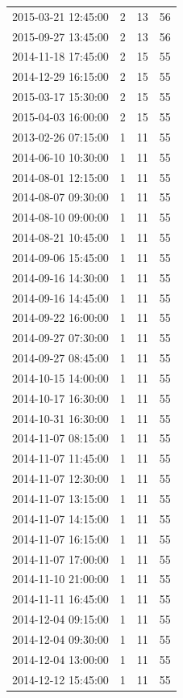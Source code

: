 \begin{tabular}{lrrr}
2015-03-21 12:45:00 & 2 & 13 & 56 \\
2015-09-27 13:45:00 & 2 & 13 & 56 \\
2014-11-18 17:45:00 & 2 & 15 & 55 \\
2014-12-29 16:15:00 & 2 & 15 & 55 \\
2015-03-17 15:30:00 & 2 & 15 & 55 \\
2015-04-03 16:00:00 & 2 & 15 & 55 \\
2013-02-26 07:15:00 & 1 & 11 & 55 \\
2014-06-10 10:30:00 & 1 & 11 & 55 \\
2014-08-01 12:15:00 & 1 & 11 & 55 \\
2014-08-07 09:30:00 & 1 & 11 & 55 \\
2014-08-10 09:00:00 & 1 & 11 & 55 \\
2014-08-21 10:45:00 & 1 & 11 & 55 \\
2014-09-06 15:45:00 & 1 & 11 & 55 \\
2014-09-16 14:30:00 & 1 & 11 & 55 \\
2014-09-16 14:45:00 & 1 & 11 & 55 \\
2014-09-22 16:00:00 & 1 & 11 & 55 \\
2014-09-27 07:30:00 & 1 & 11 & 55 \\
2014-09-27 08:45:00 & 1 & 11 & 55 \\
2014-10-15 14:00:00 & 1 & 11 & 55 \\
2014-10-17 16:30:00 & 1 & 11 & 55 \\
2014-10-31 16:30:00 & 1 & 11 & 55 \\
2014-11-07 08:15:00 & 1 & 11 & 55 \\
2014-11-07 11:45:00 & 1 & 11 & 55 \\
2014-11-07 12:30:00 & 1 & 11 & 55 \\
2014-11-07 13:15:00 & 1 & 11 & 55 \\
2014-11-07 14:15:00 & 1 & 11 & 55 \\
2014-11-07 16:15:00 & 1 & 11 & 55 \\
2014-11-07 17:00:00 & 1 & 11 & 55 \\
2014-11-10 21:00:00 & 1 & 11 & 55 \\
2014-11-11 16:45:00 & 1 & 11 & 55 \\
2014-12-04 09:15:00 & 1 & 11 & 55 \\
2014-12-04 09:30:00 & 1 & 11 & 55 \\
2014-12-04 13:00:00 & 1 & 11 & 55 \\
2014-12-12 15:45:00 & 1 & 11 & 55 \\

\end{tabular}
